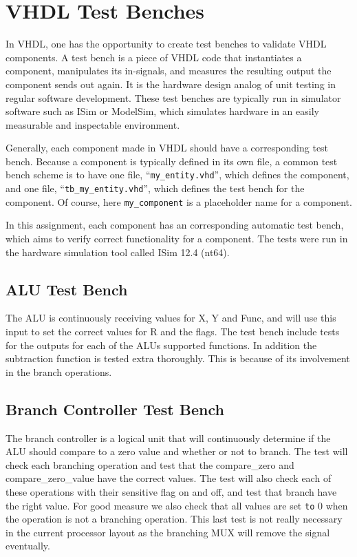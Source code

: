 \section{VHDL Test Benches}

In VHDL, one has the opportunity to create test benches to validate VHDL components.
A test bench is a piece of VHDL code that instantiates a component, manipulates its in-signals, and measures the resulting output the component sends out again.
It is the hardware design analog of unit testing in regular software development.
These test benches are typically run in simulator software such as ISim or ModelSim, which simulates hardware in an easily measurable and inspectable environment.

Generally, each component made in VHDL should have a corresponding test bench.
Because a component is typically defined in its own file, a common test bench scheme is to have one file, ``\texttt{my\_entity.vhd}'', which defines the component, and one file, ``\texttt{tb\_my\_entity.vhd}'', which defines the test bench for the component.
Of course, here \texttt{my\_component} is a placeholder name for a component.

In this assignment, each component has an corresponding automatic test bench, which aims to verify correct functionality for a component.
The tests were run in the hardware simulation tool called ISim 12.4 (nt64).

\subsection{ALU Test Bench}

The ALU is continuously receiving values for X, Y and Func, and will use this input to set the correct values for R and the flags.
The test bench include tests for the outputs for each of the ALUs supported functions.
In addition the subtraction function is tested extra thoroughly.
This is because of its involvement in the branch operations.

\subsection{Branch Controller Test Bench}

The branch controller is a logical unit that will continuously determine if the ALU should compare to a zero value and whether or not to branch.
The test will check each branching operation and test that the compare\_zero and compare\_zero\_value have the correct values.
The test will also check each of these operations with their sensitive flag on and off, and test that branch have the right value.
For good measure we also check that all values are set \texttt{to} 0 when the operation is not a branching operation.
This last test is not really necessary in the current processor layout as the branching MUX will remove the signal eventually.

